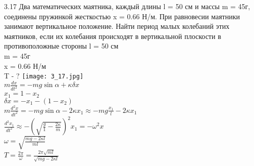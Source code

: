 \testCom
{%
	3.17
}
{%
	Два математических маятника, каждый длины l = 50 см и массы m = 45г, соединены пружинкой жесткостью x = 0.66 Н/м. При равновесии маятники занимают вертикальное положение. Найти период малых колебаний этих маятников, если их колебания происходят в вертикальной плоскости в противоположные стороны 
}
{%
	l = 50 см\\
	m = 45г\\
	x = 0.66 Н/м\\
}
{%
	T - ?
}
{%
	\texttt{[image: 3\_17.jpg]}\\
	$m \frac{dx}{dt^2} = - m g \sin \alpha + \kappa \delta x$\\
	${x}_{1} = 1 - {x}_{2}$\\
	$\delta x = - {x}_{1} - (1 - {x}_{2})$\\
	$m\frac{d^2x}{dt^2}= -mg\sin \alpha - 2 \kappa {x}_{1} \approx - mg \frac{{x}_{1}}{l} - 2\kappa {x}_{1} $\\
	$\frac{d^2{x}_{1}}{dt^2} \approx - (\sqrt{\frac{g}{1} - \frac{2 \kappa}{m}})^2 {x}_{1} = - \omega ^2 x$\\
	$\omega = \sqrt{\frac{mg - 2 \kappa l}{ml}}$\\
	$T=\frac{2 \pi}{\omega} = \frac{2\pi \sqrt{ml}}{\sqrt{mg - 2 \kappa l}}$\
}


